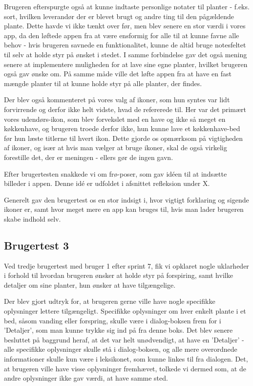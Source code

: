 Brugeren efterspurgte også at kunne indtaste personlige notater til planter - f.eks. sort, hvilken leverandør der er blevet brugt og andre ting til den pågældende plante. Dette havde vi ikke tænkt over før, men blev senere en stor værdi i vores app, da den løftede appen fra at være ensformig for alle til at kunne favne alle behov - hvis brugeren savnede en funktionalitet, kunne de altid bruge notesfeltet til selv at holde styr på ønsket i stedet. I samme forbindelse gav det også mening senere at implementere muligheden for at lave sine egne planter, hvilket brugeren også gav ønske om. På samme måde ville det løfte appen fra at have en fast mængde planter til at kunne holde styr på alle planter, der findes.

Der blev også kommenteret på vores valg af ikoner, som hun syntes var lidt forvirrende og derfor ikke helt vidste, hvad de refererede til. Her var det primært vores udendørs-ikon, som blev forvekslet med en have og ikke så meget en køkkenhave, og brugeren troede derfor ikke, hun kunne lave et køkkenhave-bed før hun læste titlerne til hvert ikon. Dette gjorde os opmærksom på vigtigheden af ikoner, og især at hvis man vælger at bruge ikoner, skal de også virkelig forestille det, der er meningen - ellers gør de ingen gavn.

Efter brugertesten snakkede vi om frø-poser, som gav idéen til at indsætte billeder i appen. Denne idé er udfoldet i afsnittet refleksion under X.

Generelt gav den brugertest os en stor indsigt i, hvor vigtigt forklaring og sigende ikoner er, samt hvor meget mere en app kan bruges til, hvis man lader brugeren skabe indhold selv.

\subsection{Brugertest 3}

Ved tredje brugertest med bruger 1 efter sprint 7, fik vi opklaret nogle uklarheder i forhold til hvordan brugeren ønsker at holde styr på forspiring, samt hvilke detaljer om sine planter, hun ønsker at have tilgængelige.

Der blev gjort udtryk for, at brugeren gerne ville have nogle specifikke oplysninger lettere tilgængeligt. Specifikke oplysninger om hver enkelt plante i et bed, såsom vanding eller forspring, skulle være i dialog-boksen frem for i 'Detaljer', som man kunne trykke sig ind på fra denne boks. Det blev senere besluttet på baggrund heraf, at det var helt unødvendigt, at have en 'Detaljer' - alle specifikke oplysninger skulle stå i dialog-boksen, og alle mere overordnede informationer skulle kun være i leksikonet, som kunne linkes til fra dialogen. Det, at brugeren ville have visse oplysninger fremhævet, tolkede vi dermed som, at de andre oplysninger ikke gav værdi, at have samme sted.

